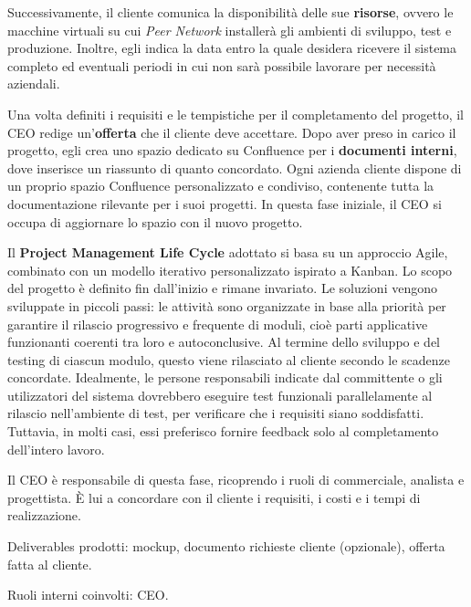     Successivamente, il cliente comunica la disponibilità delle sue \textbf{risorse}, ovvero le macchine virtuali su cui \textit{Peer Network}
    installerà gli ambienti di sviluppo, test e produzione. Inoltre, egli indica la data entro la quale desidera ricevere il sistema completo
    ed eventuali periodi in cui non sarà possibile lavorare per necessità aziendali.

    Una volta definiti i requisiti e le tempistiche per il completamento del progetto, il CEO redige un’\textbf{offerta} che il cliente
    deve accettare. Dopo aver preso in carico il progetto, egli crea uno spazio dedicato su Confluence per i \textbf{documenti interni}, dove
    inserisce un riassunto di quanto concordato. Ogni azienda cliente dispone
    di un proprio spazio Confluence personalizzato e condiviso, contenente tutta la documentazione rilevante per i suoi progetti.
    In questa fase iniziale, il CEO si occupa di aggiornare lo spazio con il nuovo progetto.

    Il \textbf{Project Management Life Cycle} adottato si basa su un approccio Agile, combinato con un modello iterativo personalizzato
    ispirato a Kanban. Lo scopo del progetto è definito fin dall'inizio e rimane invariato. Le soluzioni vengono sviluppate in
    piccoli passi: le attività sono organizzate in base alla priorità per garantire il rilascio progressivo e frequente di moduli,
    cioè parti applicative funzionanti coerenti tra loro e autoconclusive. Al termine dello sviluppo e del testing di ciascun modulo,
    questo viene rilasciato al cliente secondo le scadenze concordate. Idealmente, le persone responsabili indicate dal committente o
    gli utilizzatori del sistema dovrebbero eseguire test funzionali
    parallelamente al rilascio nell’ambiente di test, per verificare che i requisiti siano soddisfatti. Tuttavia, in molti casi, essi
    preferisco fornire feedback solo al completamento dell'intero lavoro.

    Il CEO è responsabile di questa fase, ricoprendo i ruoli di commerciale, analista e progettista. È lui a concordare con il cliente i requisiti, i costi e i tempi di realizzazione.

    Deliverables prodotti: mockup, documento richieste cliente (opzionale), offerta fatta al cliente.

    Ruoli interni coinvolti: CEO.

